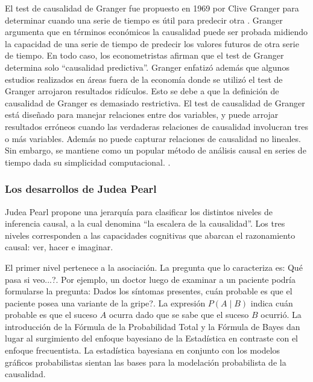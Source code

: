 \begin{introduction}
	El test de causalidad de Granger fue propuesto en 1969 por Clive Granger  para determinar cuando una serie de tiempo es útil para predecir otra \cite{10.2307/1912791}. Granger argumenta que en términos económicos la causalidad puede ser probada midiendo la capacidad de una serie de tiempo de predecir los valores futuros de otra serie de tiempo. En todo caso, los econometristas afirman que el test de Granger determina solo \textquotedblleft causalidad predictiva\textquotedblright. Granger enfatizó además que algunos estudios realizados en áreas fuera de la economía donde se utilizó el test de Granger arrojaron resultados ridículos. Esto se debe a que la definición de causalidad de Granger es demasiado restrictiva. El test de causalidad de Granger está diseñado para manejar relaciones entre dos variables, y puede arrojar resultados erróneos cuando las verdaderas relaciones de causalidad involucran tres o más variables. Además no puede capturar relaciones de causalidad no lineales. Sin embargo, se mantiene como un popular método de análisis causal en series de tiempo dada su simplicidad computacional. \cite{enwiki:1049120222}.	
	
	\subsubsection{Los desarrollos de Judea Pearl}
	Judea Pearl propone una jerarquía para clasificar los distintos niveles de inferencia causal, a la cual denomina \textquotedblleft la escalera de la causalidad\textquotedblright. Los tres niveles corresponden a las capacidades cognitivas que abarcan el razonamiento causal: ver, hacer e imaginar.
	
	El primer nivel pertenece a la asociación. La pregunta que lo caracteriza es: \textquestiondown Qué pasa si veo...?. Por ejemplo, un doctor luego de examinar a un paciente podría formularse la pregunta: \textquestiondown Dados los síntomas presentes, cuán probable es que el paciente posea una variante de la gripe?. La expresión $P(A\mid B)$ indica cuán probable es que el suceso $A$ ocurra dado que se sabe que el suceso $B$ ocurrió. La introducción de la Fórmula de la Probabilidad Total y la Fórmula de Bayes dan lugar al surgimiento del enfoque bayesiano de la Estadística en contraste con el enfoque frecuentista. La estadística bayesiana en conjunto con los modelos gráficos probabilistas sientan las bases para la modelación probabilista de la causalidad.
	

\end{introduction}
